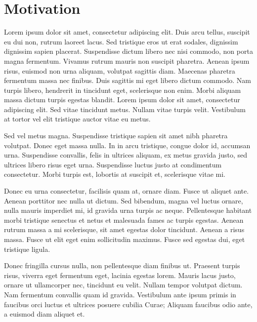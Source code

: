 \chapter{Motivation}
Lorem ipsum dolor sit amet, consectetur adipiscing elit. Duis arcu tellus, suscipit eu dui non, rutrum laoreet lacus. Sed tristique eros ut erat sodales, dignissim dignissim sapien placerat. Suspendisse dictum libero nec nisi commodo, non porta magna fermentum. Vivamus rutrum mauris non suscipit pharetra. Aenean ipsum risus, euismod non urna aliquam, volutpat sagittis diam. Maecenas pharetra fermentum massa nec finibus. Duis sagittis mi eget libero dictum commodo. Nam turpis libero, hendrerit in tincidunt eget, scelerisque non enim. Morbi aliquam massa dictum turpis egestas blandit. Lorem ipsum dolor sit amet, consectetur adipiscing elit. Sed vitae tincidunt metus. Nullam vitae turpis velit. Vestibulum at tortor vel elit tristique auctor vitae eu metus.

Sed vel metus magna. Suspendisse tristique sapien sit amet nibh pharetra volutpat. Donec eget massa nulla. In in arcu tristique, congue dolor id, accumsan urna. Suspendisse convallis, felis in ultrices aliquam, ex metus gravida justo, sed ultrices libero risus eget urna. Suspendisse luctus justo at condimentum consectetur. Morbi turpis est, lobortis at suscipit et, scelerisque vitae mi.

Donec eu urna consectetur, facilisis quam at, ornare diam. Fusce ut aliquet ante. Aenean porttitor nec nulla ut dictum. Sed bibendum, magna vel luctus ornare, nulla mauris imperdiet mi, id gravida urna turpis ac neque. Pellentesque habitant morbi tristique senectus et netus et malesuada fames ac turpis egestas. Aenean rutrum massa a mi scelerisque, sit amet egestas dolor tincidunt. Aenean a risus massa. Fusce ut elit eget enim sollicitudin maximus. Fusce sed egestas dui, eget tristique ligula.

Donec fringilla cursus nulla, non pellentesque diam finibus ut. Praesent turpis risus, viverra eget fermentum eget, lacinia egestas lorem. Mauris lacus justo, ornare ut ullamcorper nec, tincidunt eu velit. Nullam tempor volutpat dictum. Nam fermentum convallis quam id gravida. Vestibulum ante ipsum primis in faucibus orci luctus et ultrices posuere cubilia Curae; Aliquam faucibus odio ante, a euismod diam aliquet et.
